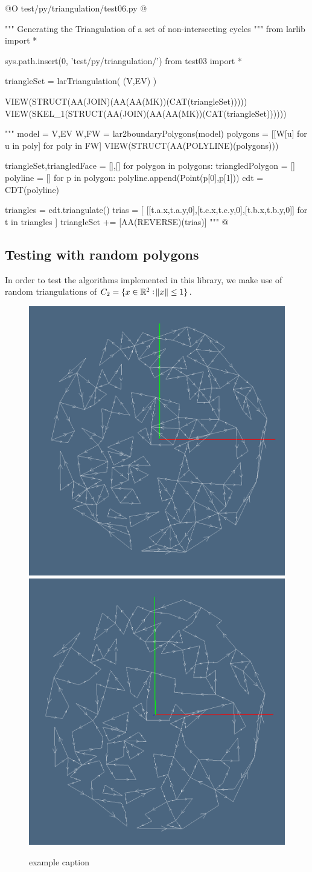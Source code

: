 \documentclass[11pt,oneside]{article}	%
\def\R{\mathbb{R}}
\begin{document}
@O test/py/triangulation/test06.py
@{""" Generating the Triangulation of a set of non-intersecting cycles """
from larlib import *

sys.path.insert(0, 'test/py/triangulation/')
from test03 import *

triangleSet = larTriangulation( (V,EV) )

VIEW(STRUCT(AA(JOIN)(AA(AA(MK))(CAT(triangleSet)))))
VIEW(SKEL_1(STRUCT(AA(JOIN)(AA(AA(MK))(CAT(triangleSet))))))

"""
model = V,EV
W,FW = lar2boundaryPolygons(model)
polygons = [[W[u] for u in poly] for poly in FW]
VIEW(STRUCT(AA(POLYLINE)(polygons)))

triangleSet,triangledFace = [],[]
for polygon in polygons:  
    triangledPolygon = []
    polyline = []
    for p in polygon:
        polyline.append(Point(p[0],p[1]))
    cdt = CDT(polyline)

    triangles = cdt.triangulate()
    trias = [ [[t.a.x,t.a.y,0],[t.c.x,t.c.y,0],[t.b.x,t.b.y,0]] for t in triangles ]
    triangleSet += [AA(REVERSE)(trias)]
"""
@}


\subsection{Testing with random polygons}

In order to test the algorithms implemented in this library, we make use of random triangulations of $C_2=\{x\in\R^2: \norm{x}\leq 1\}$.

\begin{figure}[htbp] %
   \centering
   \includegraphics[width=0.33\linewidth]{images/alg-tria0} 
   \includegraphics[width=0.33\linewidth]{images/alg-tria1} 
   \caption{example caption}
   \label{fig:example}
\end{figure}
\end{document}
